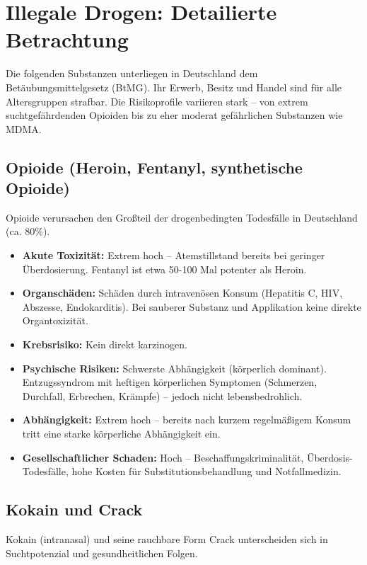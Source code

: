 \documentclass[11pt,a4paper]{article}
\begin{document}
	\section{Illegale Drogen: Detailierte Betrachtung}
	
	Die folgenden Substanzen unterliegen in Deutschland dem Betäubungsmittelgesetz (BtMG). Ihr Erwerb, Besitz und Handel sind für alle Altersgruppen strafbar. Die Risikoprofile variieren stark – von extrem suchtgefährdenden Opioiden bis zu eher moderat gefährlichen Substanzen wie MDMA.
	
	\subsection{Opioide (Heroin, Fentanyl, synthetische Opioide)}
	
	Opioide verursachen den Großteil der drogenbedingten Todesfälle in Deutschland (ca. 80\%). \cite{drugcom-opioid}
	
	\begin{itemize}[leftmargin=*, noitemsep]
		\item \textbf{Akute Toxizität:} Extrem hoch – Atemstillstand bereits bei geringer Überdosierung. Fentanyl ist etwa 50-100 Mal potenter als Heroin.
		\item \textbf{Organschäden:} Schäden durch intravenösen Konsum (Hepatitis C, HIV, Abszesse, Endokarditis). Bei sauberer Substanz und Applikation keine direkte Organtoxizität.
		\item \textbf{Krebsrisiko:} Kein direkt karzinogen.
		\item \textbf{Psychische Risiken:} Schwerste Abhängigkeit (körperlich dominant). Entzugssyndrom mit heftigen körperlichen Symptomen (Schmerzen, Durchfall, Erbrechen, Krämpfe) – jedoch nicht lebensbedrohlich.
		\item \textbf{Abhängigkeit:} Extrem hoch – bereits nach kurzem regelmäßigem Konsum tritt eine starke körperliche Abhängigkeit ein.
		\item \textbf{Gesellschaftlicher Schaden:} Hoch – Beschaffungskriminalität, Überdosis-Todesfälle, hohe Kosten für Substitutionsbehandlung und Notfallmedizin.
	\end{itemize}
	
	\subsection{Kokain und Crack}
	
	Kokain (intranasal) und seine rauchbare Form Crack unterscheiden sich in Suchtpotenzial und gesundheitlichen Folgen. \cite{nutt-scale}
	
\end{document}
